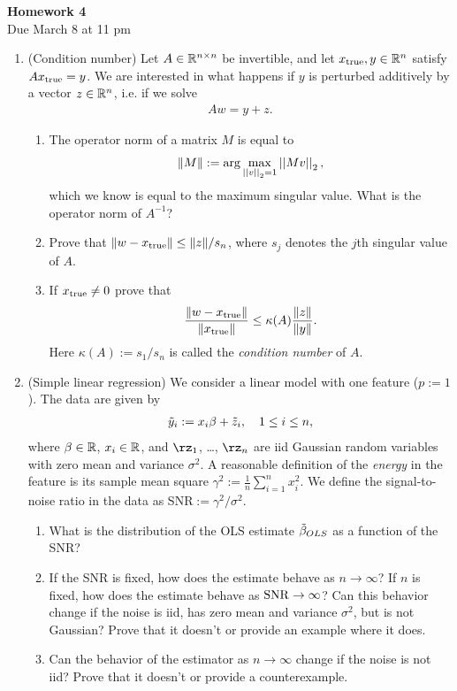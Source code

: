 \documentclass[12pt,twoside]{article}
\begin{document}
\begin{center}
{\large{\textbf{Homework 4}} } \vspace{0.2cm}\\
Due March 8 at 11 pm
\end{center}

\begin{enumerate}

\item (Condition number) Let $A\in \mathbb{R}^{n\times n}$ be invertible, and let $x_{\operatorname{true}},y\in \mathbb{R}^n$
  satisfy $Ax_{\operatorname{true}}=y$. We are interested in what happens if $y$ is perturbed additively by a vector $z\in \mathbb{R}^n$, i.e. if we solve 
\begin{align}
A w=y+z.
\end{align}
  \begin{enumerate}
  \item The operator norm of a matrix $M$ is equal to 
  \begin{align}
  \lVert M\rVert := \arg \max_{\left|\left| v \right|\right| _{2} = 1} \left|\left| Mv \right|\right| _{2},
  \end{align}  
  which we know is equal to the maximum singular value. What is the operator norm of $A^{-1}$?
  \item Prove that $\|w-x_{\operatorname{true}}\|\leq \|z\|/s_n$, where
    $s_j$ denotes the $j$th singular value of $A$.
  \item If $x_{\operatorname{true}}\neq 0$ prove that
    $$\frac{\|w-x_{\operatorname{true}}\|}{\|x_{\operatorname{true}}\|} \leq
    \kappa(A)\frac{\|z\|}{\|y\|}.$$
    Here $\kappa(A):=s_1/s_n$ is called the \textit{condition
    number} of $A$.
  \end{enumerate} 
  
  \item (Simple linear regression) We consider a linear model with one feature ($p:=1$). The data are given by
\begin{align}
\tilde{  y }_i : = x_i \beta + \tilde{ z }_i, \quad 1 \leq i \leq n,
\end{align}
where $\beta \in \mathbb{R}$, $x_i \in \mathbb{R}$, and $\rz_1$, \ldots, $\rz_n$ are iid Gaussian random variables with zero mean and variance $\sigma^2$. A reasonable definition of the \emph{energy} in the feature is its sample mean square $\gamma^2 :=\frac{1}{n}\sum_{i=1}^{n}x_i^2$. We define the signal-to-noise ratio in the data as SNR$:= \gamma^2/\sigma^2$.
  \begin{enumerate}
  \item What is the distribution of the OLS estimate $\tilde{ \beta }_{OLS}$ as a function of the SNR?
  \item If the SNR is fixed, how does the estimate behave as $n \rightarrow \infty$? If $n$ is fixed, how does the estimate behave as $\operatorname{SNR} \rightarrow \infty$? Can this behavior change if the noise is iid, has zero mean and variance $\sigma^2$, but is not Gaussian? Prove that it doesn't or provide an example where it does.
  \item Can the behavior of the estimator as $n \rightarrow \infty$ change if the noise is not iid? Prove that it doesn't or provide a counterexample.
  \end{enumerate} 
   

\end{enumerate}
\end{document}
